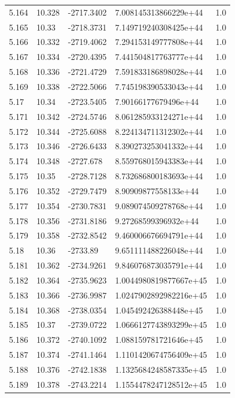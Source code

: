 \begin{tabular}{lllll}
5.164 & 10.328 & -2717.3402 & 7.008145313866229e+44 & 1.0 \\
5.165 & 10.33 & -2718.3731 & 7.149719240308425e+44 & 1.0 \\
5.166 & 10.332 & -2719.4062 & 7.294153149777808e+44 & 1.0 \\
5.167 & 10.334 & -2720.4395 & 7.441504817763777e+44 & 1.0 \\
5.168 & 10.336 & -2721.4729 & 7.591833186898028e+44 & 1.0 \\
5.169 & 10.338 & -2722.5066 & 7.745198390533043e+44 & 1.0 \\
5.17 & 10.34 & -2723.5405 & 7.90166177679496e+44 & 1.0 \\
5.171 & 10.342 & -2724.5746 & 8.061285933124271e+44 & 1.0 \\
5.172 & 10.344 & -2725.6088 & 8.224134711312302e+44 & 1.0 \\
5.173 & 10.346 & -2726.6433 & 8.390273253041332e+44 & 1.0 \\
5.174 & 10.348 & -2727.678 & 8.559768015943383e+44 & 1.0 \\
5.175 & 10.35 & -2728.7128 & 8.732686800183693e+44 & 1.0 \\
5.176 & 10.352 & -2729.7479 & 8.90909877558133e+44 & 1.0 \\
5.177 & 10.354 & -2730.7831 & 9.089074509278768e+44 & 1.0 \\
5.178 & 10.356 & -2731.8186 & 9.27268599396932e+44 & 1.0 \\
5.179 & 10.358 & -2732.8542 & 9.460006676694791e+44 & 1.0 \\
5.18 & 10.36 & -2733.89 & 9.651111488226048e+44 & 1.0 \\
5.181 & 10.362 & -2734.9261 & 9.846076873035791e+44 & 1.0 \\
5.182 & 10.364 & -2735.9623 & 1.0044980819877667e+45 & 1.0 \\
5.183 & 10.366 & -2736.9987 & 1.0247902892982216e+45 & 1.0 \\
5.184 & 10.368 & -2738.0354 & 1.045492426388448e+45 & 1.0 \\
5.185 & 10.37 & -2739.0722 & 1.0666127743893299e+45 & 1.0 \\
5.186 & 10.372 & -2740.1092 & 1.088159781721646e+45 & 1.0 \\
5.187 & 10.374 & -2741.1464 & 1.1101420674756409e+45 & 1.0 \\
5.188 & 10.376 & -2742.1838 & 1.1325684248587335e+45 & 1.0 \\
5.189 & 10.378 & -2743.2214 & 1.1554478247128512e+45 & 1.0 \\

\end{tabular}
